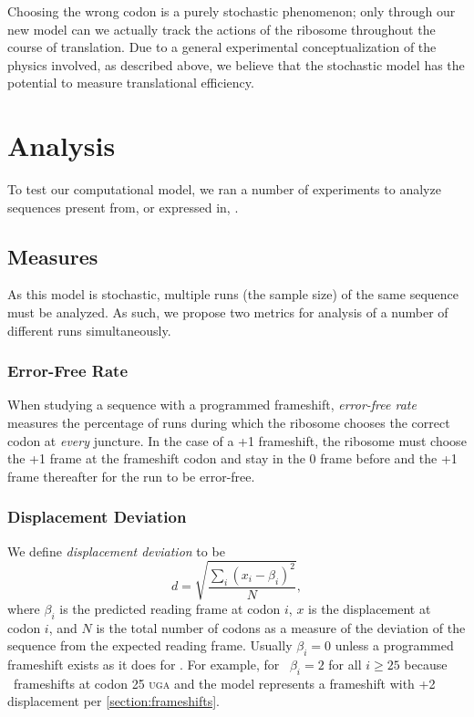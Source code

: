 \documentclass[12pt]{article}
\begin{document}
Choosing the wrong codon is a purely stochastic phenomenon; only through our new
model can we actually track the actions of the ribosome throughout the course
of translation.  Due to a general experimental conceptualization of the physics involved,
as described above, we believe that the stochastic model has the potential to 
measure translational efficiency.

\section{Analysis}
To test our computational model, we ran a number of
experiments to analyze sequences present from, or expressed in, \ecoli.

\subsection{Measures}
\label{section:metrics}

As this model is stochastic, multiple runs (the sample size) of the same sequence must be analyzed.
As such, we propose two metrics for analysis of a number of different runs 
simultaneously. 

\subsubsection{Error-Free Rate}
\label{section:efr}
When studying a
sequence with a programmed frameshift, \emph{error-free rate} measures the percentage of runs 
during which the ribosome chooses the correct codon
at \emph{every} juncture.  In the case of a +1 frameshift, the ribosome must
choose the +1 frame at the frameshift codon and stay in the 0 frame before
and the +1 frame thereafter for the run to be error-free.

\subsubsection{Displacement Deviation}
\label{section:deviation}

We define \emph{displacement deviation} to be
\begin{equation}
    d = \sqrt{\frac{\sum_i (x_i - \beta_i)^2}{N}},
\end{equation}
where $\beta_i$ is the predicted reading frame at codon $i$, $x$ is
the displacement at codon $i$, and $N$ is the total number of codons
as a measure of the deviation of the sequence from the expected
reading frame.  Usually $\beta_i = 0$ unless a programmed frameshift
exists as it does for \prfB.  For example, for \prfB\ $\beta_i = 2$
for all $i \geq 25$ because \prfB\ frameshifts at codon 25
\textsc{uga} and the model represents a frameshift with +2
displacement per \autoref{section:frameshifts}.
\end{document}
